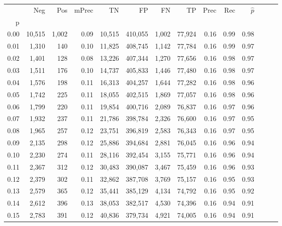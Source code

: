 \begin{tabular}{rrrrrrrrrrrrrr}
\toprule
{} &     Neg &    Pos & mPrec &       TN &       FP &      FN &      TP &  Prec &   Rec & $\hat{p}$ \\
p    &         &        &       &          &          &         &         &       &       &           \\
\midrule
0.00 &  10,515 &  1,002 &  0.09 &   10,515 &  410,055 &   1,002 &  77,924 &  0.16 &  0.99 &      0.98 \\
0.01 &   1,310 &    140 &  0.10 &   11,825 &  408,745 &   1,142 &  77,784 &  0.16 &  0.99 &      0.97 \\
0.02 &   1,401 &    128 &  0.08 &   13,226 &  407,344 &   1,270 &  77,656 &  0.16 &  0.98 &      0.97 \\
0.03 &   1,511 &    176 &  0.10 &   14,737 &  405,833 &   1,446 &  77,480 &  0.16 &  0.98 &      0.97 \\
0.04 &   1,576 &    198 &  0.11 &   16,313 &  404,257 &   1,644 &  77,282 &  0.16 &  0.98 &      0.96 \\
0.05 &   1,742 &    225 &  0.11 &   18,055 &  402,515 &   1,869 &  77,057 &  0.16 &  0.98 &      0.96 \\
0.06 &   1,799 &    220 &  0.11 &   19,854 &  400,716 &   2,089 &  76,837 &  0.16 &  0.97 &      0.96 \\
0.07 &   1,932 &    237 &  0.11 &   21,786 &  398,784 &   2,326 &  76,600 &  0.16 &  0.97 &      0.95 \\
0.08 &   1,965 &    257 &  0.12 &   23,751 &  396,819 &   2,583 &  76,343 &  0.16 &  0.97 &      0.95 \\
0.09 &   2,135 &    298 &  0.12 &   25,886 &  394,684 &   2,881 &  76,045 &  0.16 &  0.96 &      0.94 \\
0.10 &   2,230 &    274 &  0.11 &   28,116 &  392,454 &   3,155 &  75,771 &  0.16 &  0.96 &      0.94 \\
0.11 &   2,367 &    312 &  0.12 &   30,483 &  390,087 &   3,467 &  75,459 &  0.16 &  0.96 &      0.93 \\
0.12 &   2,379 &    302 &  0.11 &   32,862 &  387,708 &   3,769 &  75,157 &  0.16 &  0.95 &      0.93 \\
0.13 &   2,579 &    365 &  0.12 &   35,441 &  385,129 &   4,134 &  74,792 &  0.16 &  0.95 &      0.92 \\
0.14 &   2,612 &    396 &  0.13 &   38,053 &  382,517 &   4,530 &  74,396 &  0.16 &  0.94 &      0.91 \\
0.15 &   2,783 &    391 &  0.12 &   40,836 &  379,734 &   4,921 &  74,005 &  0.16 &  0.94 &      0.91 \\

\end{tabular}
